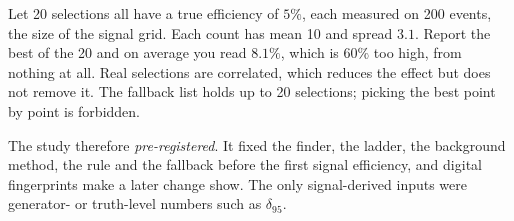 \begin{example}\label{exa:25-bestof}
Let 20 selections all have a true efficiency of $5\%$, each measured on 200 events, the size of the signal grid. Each count has mean 10
and spread $3.1$. Report the best of the 20 and on average you read $8.1\%$, which is $60\%$ too high, from nothing at all.
Real selections are correlated, which reduces the effect but does not remove it. The fallback list holds up to 20 selections;
picking the best point by point is forbidden.
\end{example}

The study therefore \emph{pre-registered}. It fixed the finder, the ladder, the background method, the rule and the fallback before the first signal efficiency, and digital fingerprints make a later change show. The only signal-derived inputs were generator- or truth-level numbers such as $\delta_{95}$.

